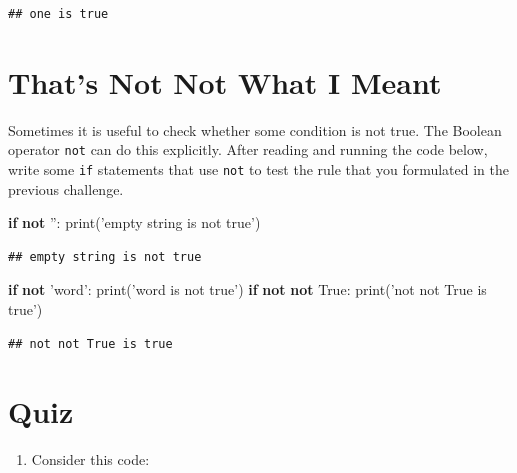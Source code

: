 \documentclass[]{book}
\newenvironment{Shaded}{\begin{snugshade}}{\end{snugshade}}
\newcommand{\BuiltInTok}[1]{#1}
\newcommand{\ControlFlowTok}[1]{\textcolor[rgb]{0.13,0.29,0.53}{\textbf{#1}}}
\newcommand{\KeywordTok}[1]{\textcolor[rgb]{0.13,0.29,0.53}{\textbf{#1}}}
\newcommand{\NormalTok}[1]{#1}
\newcommand{\StringTok}[1]{\textcolor[rgb]{0.31,0.60,0.02}{#1}}
\newcommand{\VariableTok}[1]{\textcolor[rgb]{0.00,0.00,0.00}{#1}}
\providecommand{\tightlist}{%
  \setlength{\itemsep}{0pt}\setlength{\parskip}{0pt}}
\theoremstyle{definition}
\theoremstyle{definition}
\theoremstyle{definition}
\theoremstyle{remark}
\begin{document}
\begin{verbatim}
## one is true
\end{verbatim}

\hypertarget{thats-not-not-what-i-meant}{%
\section{That's Not Not What I Meant}\label{thats-not-not-what-i-meant}}

Sometimes it is useful to check whether some condition is not true. The
Boolean operator \texttt{not} can do this explicitly. After reading and
running the code below, write some \texttt{if} statements that use
\texttt{not} to test the rule that you formulated in the previous
challenge.

\begin{Shaded}
\begin{Highlighting}[]
\ControlFlowTok{if} \KeywordTok{not} \StringTok{''}\NormalTok{:}
    \BuiltInTok{print}\NormalTok{(}\StringTok{'empty string is not true'}\NormalTok{)}
\end{Highlighting}
\end{Shaded}

\begin{verbatim}
## empty string is not true
\end{verbatim}

\begin{Shaded}
\begin{Highlighting}[]
\ControlFlowTok{if} \KeywordTok{not} \StringTok{'word'}\NormalTok{:}
    \BuiltInTok{print}\NormalTok{(}\StringTok{'word is not true'}\NormalTok{)}
\ControlFlowTok{if} \KeywordTok{not} \KeywordTok{not} \VariableTok{True}\NormalTok{:}
    \BuiltInTok{print}\NormalTok{(}\StringTok{'not not True is true'}\NormalTok{)}
\end{Highlighting}
\end{Shaded}

\begin{verbatim}
## not not True is true
\end{verbatim}

\hypertarget{quiz-2}{%
\section{Quiz}\label{quiz-2}}

\begin{enumerate}
\def\labelenumi{\arabic{enumi}.}
\tightlist
\item
  Consider this code:
\end{enumerate}
\end{document}
